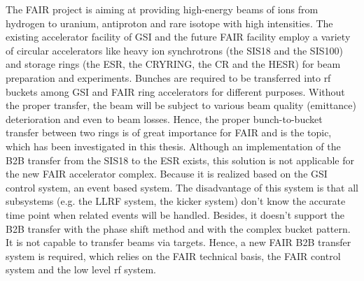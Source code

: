 The FAIR project is aiming at providing high-energy beams of ions from hydrogen to uranium, antiproton and rare isotope with high intensities. The existing accelerator facility of GSI and the future FAIR facility employ a variety of circular accelerators like heavy ion synchrotrons (the SIS18 and the SIS100) and storage rings (the ESR, the CRYRING, the CR and the HESR) for beam preparation and experiments. Bunches are required to be transferred into rf buckets among GSI and FAIR ring accelerators for different purposes. Without the proper transfer, the beam will be subject to various beam quality (emittance) deterioration and even to beam losses. Hence, the proper bunch-to-bucket transfer between two rings is of great importance for FAIR and is the topic, which has been investigated in this thesis. Although an implementation of the B2B transfer from the SIS18 to the ESR exists, this solution is not applicable for the new FAIR accelerator complex. Because it is realized based on the GSI control system, an event based system. The disadvantage of this system is that all subsystems (e.g. the LLRF system, the kicker system) don't know the accurate time point when related events will be handled. Besides, it doesn't support the B2B transfer with the phase shift method and with the complex bucket pattern. It is not capable to transfer beams via targets. Hence, a new FAIR B2B transfer system is required, which relies on the FAIR technical basis, the FAIR control system and the low level rf system.


